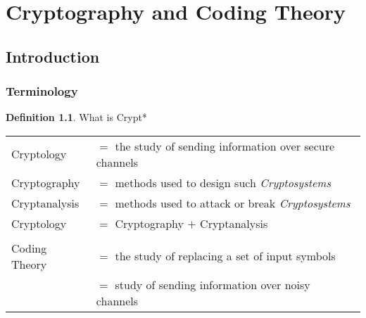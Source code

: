 \documentclass[letterpaper,10pt,twoside]{report}
\newcounter{example}
\theoremstyle{plain}
\theoremstyle{definition}
\newtheorem{definition}{Definition}[section]
\theoremstyle{remark}
\begin{document}
\pagestyle{fancy}

\renewcommand{\chaptermark}[1]{\markboth{\chaptername \ \thechapter.\ #1}{}} 
\renewcommand{\sectionmark}[1]{\markright{\thesection.\ #1}{}}
\fancyhead[LE,RO]{\sffamily\bfseries \rightmark}
\fancyhead[LO,RE]{\sffamily\bfseries \leftmark}

\setcounter{chapter}{0}
\setcounter{definition}{1}
\setcounter{example}{1}

\chapter{Cryptography and Coding Theory}
\section{Introduction}
\subsection{Terminology}

\begin{definition}{What is Crypt*}

\begin{tabular}{ll}
   Cryptology      & $ = $ the study of sending information over secure channels \\
   Cryptography    & $ = $ methods used to design such \emph{Cryptosystems} \\
   Cryptanalysis   & $ = $ methods used to attack or break \emph{Cryptosystems} \\
   Cryptology      & $ = $ Cryptography $ + $ Cryptanalysis \\
   & \\
   Coding Theory   & $ = $ the study of replacing a set of input symbols \\
                   & $ = $ study of sending information over noisy channels \\
\end{tabular}

\end{definition}
\end{document}
